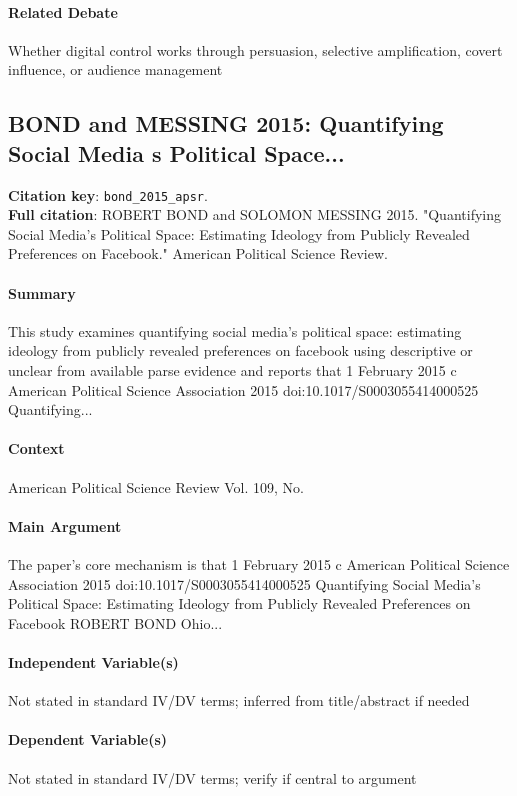 \documentclass[12pt]{article}
\begin{document}
\paragraph{Related Debate} Whether digital control works through persuasion, selective amplification, covert influence, or audience management


\subsection{BOND and MESSING 2015: Quantifying Social Media s Political Space...}
\textbf{Citation key}: \texttt{bond\_2015\_apsr}.\\
\textbf{Full citation}: ROBERT BOND and SOLOMON MESSING 2015. "Quantifying Social Media's Political Space: Estimating Ideology from Publicly Revealed Preferences on Facebook." American Political Science Review.

\paragraph{Summary} This study examines quantifying social media's political space: estimating ideology from publicly revealed preferences on facebook using descriptive or unclear from available parse evidence and reports that 1 February 2015 c American Political Science Association 2015  doi:10.1017/S0003055414000525 Quantifying...

\paragraph{Context} American Political Science Review Vol. 109, No.

\paragraph{Main Argument} The paper's core mechanism is that 1 February 2015 c American Political Science Association 2015  doi:10.1017/S0003055414000525 Quantifying Social Media's Political Space: Estimating Ideology from Publicly Revealed Preferences on Facebook ROBERT BOND Ohio...

\paragraph{Independent Variable(s)} Not stated in standard IV/DV terms; inferred from title/abstract if needed

\paragraph{Dependent Variable(s)} Not stated in standard IV/DV terms; verify if central to argument
\end{document}
